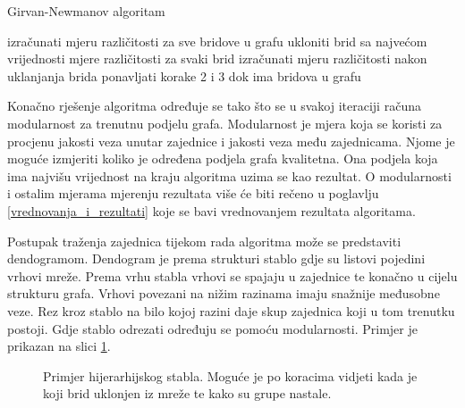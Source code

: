 \bigskip
\begin{algorithm}
\caption{Girvan-Newmanov algoritam}
\begin{algorithmic}[1]
	\STATE izračunati mjeru različitosti za sve bridove u grafu
	\STATE ukloniti brid sa najvećom vrijednosti mjere različitosti
	\STATE za svaki brid izračunati mjeru različitosti nakon uklanjanja brida
	\STATE ponavljati korake 2 i 3 dok ima bridova u grafu
\end{algorithmic}
\end{algorithm}
\bigskip

Konačno rješenje algoritma određuje se tako što se u svakoj iteraciji računa modularnost za trenutnu podjelu grafa. Modularnost je mjera koja se koristi za procjenu jakosti veza unutar zajednice i jakosti veza među zajednicama. Njome je moguće izmjeriti koliko je određena podjela grafa kvalitetna. Ona podjela koja ima najvišu vrijednost na kraju algoritma uzima se kao rezultat. O modularnosti i ostalim mjerama mjerenju rezultata više će biti rečeno u poglavlju \ref{vrednovanja_i_rezultati} koje se bavi vrednovanjem rezultata algoritama.


Postupak traženja zajednica tijekom rada algoritma može se predstaviti dendogramom. Dendogram je prema strukturi stablo gdje su listovi pojedini vrhovi mreže. Prema vrhu stabla vrhovi se spajaju u zajednice te konačno u cijelu strukturu grafa. Vrhovi povezani na nižim razinama imaju snažnije međusobne veze. Rez kroz stablo na bilo kojoj razini daje skup zajednica koji u tom trenutku postoji. Gdje stablo odrezati određuju se pomoću modularnosti. Primjer je prikazan na slici \ref{fig:dendogram}.

\begin{figure}
	\caption{Primjer hijerarhijskog stabla. Moguće je po koracima vidjeti kada je koji brid uklonjen iz mreže te kako su grupe nastale.}
	\label{fig:dendogram}
\end{figure}

